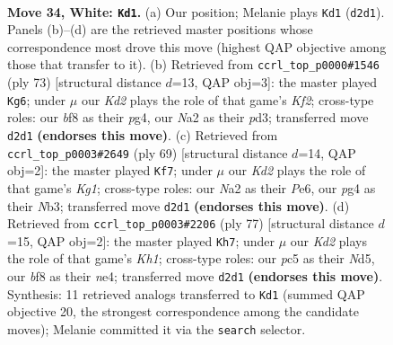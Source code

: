 \documentclass[11pt]{article}
\begin{document}
\clearpage

\begin{figure}[p]\centering
\begin{subfigure}{0.46\textwidth}\centering
\resizebox{\linewidth}{!}{%
\newchessgame
\chessboard[
  setfen={3knb2/8/4P3/2pP4/6p1/1P6/N2K4/8 w - - 0 34},
  showmover=false,
  pgfstyle=straightmove, color=movearrow, markmove={d2-d1}
]}
\caption{}
\end{subfigure}\hfill
\begin{subfigure}{0.46\textwidth}\centering
\resizebox{\linewidth}{!}{%
\newchessgame
\chessboard[
  setfen={8/5k2/7p/6p1/6P1/3P4/1b3P1K/6N1 b - - 1 37},
  showmover=false,
  pgfstyle=straightmove, color=movearrow, markmove={f7-g6}
]}
\caption{}
\end{subfigure}
\\[4pt]
\begin{subfigure}{0.46\textwidth}\centering
\resizebox{\linewidth}{!}{%
\newchessgame
\chessboard[
  setfen={6k1/8/4pp2/6p1/4P3/1n1N3P/6P1/6K1 b - - 0 35},
  showmover=false,
  pgfstyle=straightmove, color=movearrow, markmove={g8-f7}
]}
\caption{}
\end{subfigure}\hfill
\begin{subfigure}{0.46\textwidth}\centering
\resizebox{\linewidth}{!}{%
\newchessgame
\chessboard[
  setfen={7k/6p1/7p/3np3/4N3/7P/1P4P1/6K1 b - - 1 39},
  showmover=false,
  pgfstyle=straightmove, color=movearrow, markmove={h8-h7}
]}
\caption{}
\end{subfigure}
\caption{\textbf{Move 34, White: \texttt{Kd1}.} (a) Our position; Melanie plays \texttt{Kd1} (\texttt{d2d1}). Panels (b)--(d) are the retrieved master positions whose correspondence most drove this move (highest QAP objective among those that transfer to it). (b) Retrieved from \texttt{ccrl\_top\_p0000\#1546} (ply 73) [structural distance $d$=13, QAP obj=3]: the master played \texttt{Kg6}; under $\mu$ our \emph{Kd2} plays the role of that game's \emph{Kf2}; cross-type roles: our \emph{b}f8 as their \emph{p}g4, our \emph{N}a2 as their \emph{p}d3; transferred move \texttt{d2d1} \textbf{(endorses this move)}. (c) Retrieved from \texttt{ccrl\_top\_p0003\#2649} (ply 69) [structural distance $d$=14, QAP obj=2]: the master played \texttt{Kf7}; under $\mu$ our \emph{Kd2} plays the role of that game's \emph{Kg1}; cross-type roles: our \emph{N}a2 as their \emph{P}e6, our \emph{p}g4 as their \emph{N}b3; transferred move \texttt{d2d1} \textbf{(endorses this move)}. (d) Retrieved from \texttt{ccrl\_top\_p0003\#2206} (ply 77) [structural distance $d$=15, QAP obj=2]: the master played \texttt{Kh7}; under $\mu$ our \emph{Kd2} plays the role of that game's \emph{Kh1}; cross-type roles: our \emph{p}c5 as their \emph{N}d5, our \emph{b}f8 as their \emph{n}e4; transferred move \texttt{d2d1} \textbf{(endorses this move)}. Synthesis: 11 retrieved analogs transferred to \texttt{Kd1} (summed QAP objective 20, the strongest correspondence among the candidate moves); Melanie committed it via the \texttt{search} selector.}
\label{fig:thought-m66}
\end{figure}
\end{document}
